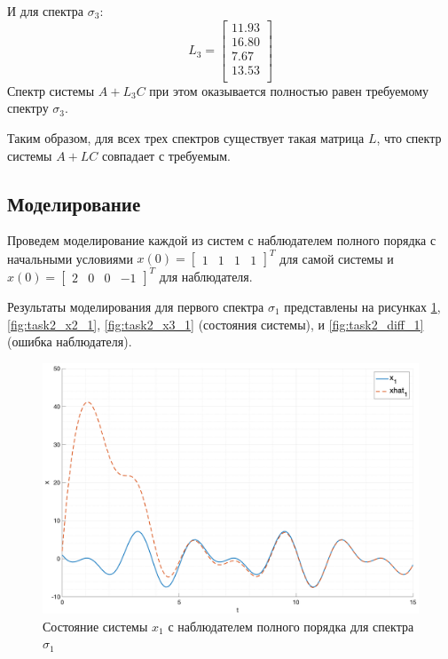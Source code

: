 И для спектра $\sigma_3$:
\begin{equation}
    L_3 = \begin{bmatrix}
        11.93 \\ 
        16.80 \\ 
        7.67 \\ 
        13.53 \\ 
    \end{bmatrix}
\end{equation}
Спектр системы $A + L_3C$ при этом оказывается полностью равен требуемому спектру $\sigma_3$. 

Таким образом, для всех трех спектров существует такая матрица $L$, что спектр системы $A + LC$ совпадает с требуемым. 

\subsection{Моделирование}
Проведем моделирование каждой из систем с наблюдателем полного порядка с начальными условиями $x(0) = \begin{bmatrix} 1 & 1 & 1 & 1 \end{bmatrix}^T$ 
для самой системы и $\hat{x}(0) = \begin{bmatrix} 2 & 0 & 0 & -1 \end{bmatrix}^T$ для наблюдателя.

Результаты моделирования для первого спектра $\sigma_1$ представлены на рисунках \ref{fig:task2_x1_1}, \ref{fig:task2_x2_1}, \ref{fig:task2_x3_1} (состояния системы), и \ref{fig:task2_diff_1} (ошибка наблюдателя).
\begin{figure}[ht!]
    \centering
    \includegraphics[width=\textwidth]{media/plots/task2_x1_1.png}
    \caption{Состояние системы $x_1$ с наблюдателем полного порядка для спектра $\sigma_1$}
    \label{fig:task2_x1_1}
\end{figure}

